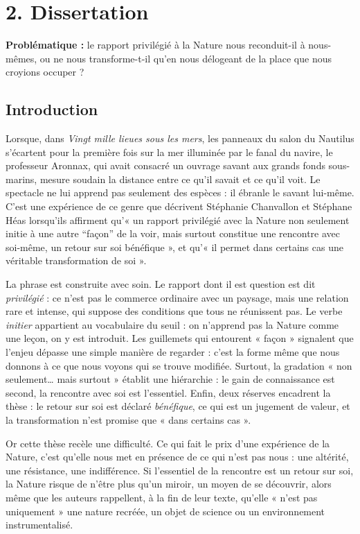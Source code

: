 \documentclass[11pt,a4paper]{article}
\begin{document}
\hypertarget{dissertation}{%
\section{2. Dissertation}\label{dissertation}}

\textbf{Problématique :} le rapport privilégié à la Nature nous reconduit-il à nous-mêmes, ou ne nous transforme-t-il qu'en nous délogeant de la place que nous croyions occuper ?

\hypertarget{introduction}{%
\subsection{Introduction}\label{introduction}}

Lorsque, dans \emph{Vingt mille lieues sous les mers}, les panneaux du salon du Nautilus s'écartent pour la première fois sur la mer illuminée par le fanal du navire, le professeur Aronnax, qui avait consacré un ouvrage savant aux grands fonds sous-marins, mesure soudain la distance entre ce qu'il savait et ce qu'il voit. Le spectacle ne lui apprend pas seulement des espèces : il ébranle le savant lui-même. C'est une expérience de ce genre que décrivent Stéphanie Chanvallon et Stéphane Héas lorsqu'ils affirment qu'« un rapport privilégié avec la Nature non seulement initie à une autre ``façon'' de la voir, mais surtout constitue une rencontre avec soi-même, un retour sur soi bénéfique », et qu'« il permet dans certains cas une véritable transformation de soi ».

La phrase est construite avec soin. Le rapport dont il est question est dit \emph{privilégié} : ce n'est pas le commerce ordinaire avec un paysage, mais une relation rare et intense, qui suppose des conditions que tous ne réunissent pas. Le verbe \emph{initier} appartient au vocabulaire du seuil : on n'apprend pas la Nature comme une leçon, on y est introduit. Les guillemets qui entourent « façon » signalent que l'enjeu dépasse une simple manière de regarder : c'est la forme même que nous donnons à ce que nous voyons qui se trouve modifiée. Surtout, la gradation « non seulement\ldots{} mais surtout » établit une hiérarchie : le gain de connaissance est second, la rencontre avec soi est l'essentiel. Enfin, deux réserves encadrent la thèse : le retour sur soi est déclaré \emph{bénéfique}, ce qui est un jugement de valeur, et la transformation n'est promise que « dans certains cas ».

Or cette thèse recèle une difficulté. Ce qui fait le prix d'une expérience de la Nature, c'est qu'elle nous met en présence de ce qui n'est pas nous : une altérité, une résistance, une indifférence. Si l'essentiel de la rencontre est un retour sur soi, la Nature risque de n'être plus qu'un miroir, un moyen de se découvrir, alors même que les auteurs rappellent, à la fin de leur texte, qu'elle « n'est pas uniquement » une nature recréée, un objet de science ou un environnement instrumentalisé.
\end{document}
